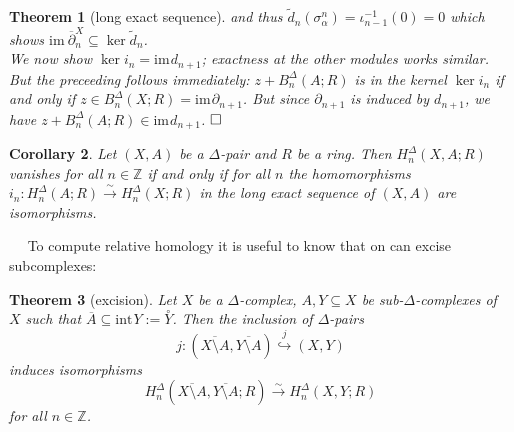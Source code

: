 \documentclass[11pt]{book}
\numberwithin{dummy}{section}
\newtheorem{theorem}{Theorem}[section]
\newtheorem{corollary}[theorem]{Corollary}
\theoremstyle{nonumberbreak}
\newenvironment{pr}[1][]{\ifthenelse{\equal{#1}{}}{\proof}{\proof[#1]}\rm}{\endproof}
\newcommand{\la}{\longrightarrow}
\begin{document}
\begin{spacing}{1.4}
\begin{theorem}[long exact sequence]
\begin{pr}
and thus $\tilde{d}_n(\sigma_{\alpha}^n)= \iota_{n-1}^{-1}(0)=0$ which shows $\mathrm{im} \ \overline{\partial}_n^X \subseteq \ker \tilde{d}_n$.\\
We now show $\ker i_n = \mathrm{im} \hspace{1pt} d_{n+1}$; exactness at the other modules works similar. But the preceeding follows immediately: $z+ B_n^{\Delta}(A;R)$ is in the kernel $\ker i_n$ if and only if $z \in B_n^{\Delta}(X;R) = \mathrm{im} \hspace{1pt} \partial_{n+1}$. But since $\partial_{n+1}$ is induced by $d_{n+1}$, we have $z + B_n^{\Delta}(A;R) \in \mathrm{im} \hspace{1pt} d_{n+1}$. $\hfill \Box$

\end{pr}
\end{theorem}

\begin{corollary}
Let $(X,A)$ be a $\Delta$-pair and $R$ be a ring. Then $H_n^{\Delta}(X,A;R)$ vanishes for all $n \in \mathbb{Z}$ if and only if for all $n$ the homomorphisms $i_n:H_n^{\Delta}(A;R) \overset{\sim}{\la} H_n^{\Delta}(X;R)$ in the long exact sequence of $(X,A)$ are isomorphisms.
\end{corollary}


$\quad$ To compute relative homology it is useful to know that on can excise subcomplexes:


\begin{theorem}[excision]
Let $X$ be a $\Delta$-complex, $A,Y \subseteq X$ be sub-$\Delta$-complexes of $X$ such that $\overline{A} \subseteq \mathrm{int} \hspace{1pt} Y := \overset{\circ}{Y}$. Then the inclusion of $\Delta$-pairs
$$j:\left( \overline{X \setminus A}, \overline{Y \setminus A} \right) \overset{j}{\hookrightarrow} (X,Y)$$
induces isomorphisms
$$H_n^{\Delta}\left( \overline{X \setminus A}, \overline{Y \setminus A};R\right) \overset{\sim}{\la} H_n^{\Delta}(X,Y;R)$$
for all $n \in \mathbb{Z}$.


\end{theorem}
\end{spacing}
\end{document}
